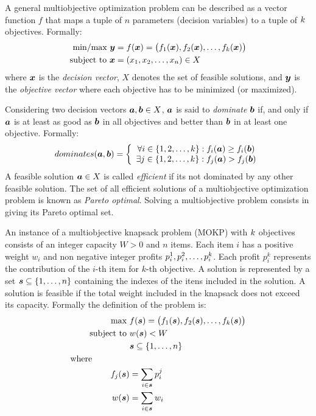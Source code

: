 A general multiobjective optimization problem can be described as a vector
function $f$ that maps a tuple of $n$ parameters (decision variables) to a tuple
of $k$ objectives.
Formally:
\begin{align*}
  \text{min/max} ~ \boldsymbol{y} &= f(\boldsymbol{x}) = 
    \big(f_1(\boldsymbol{x})
    ,f_2(\boldsymbol{x})
    ,\ldots
    ,f_{k}(\boldsymbol{x})\big) \\
  \text{subject to} ~ \boldsymbol{x} & = (x_1, x_2, \ldots, x_n) \in X
\end{align*}
where $\boldsymbol{x}$ is the \emph{decision vector}, $X$ denotes the set
of feasible solutions, and $\boldsymbol{y}$ is the \emph{objective vector} where
each objective has to be minimized (or maximized).

Considering two decision vectors $\boldsymbol{a}, \boldsymbol{b} \in X$, $\boldsymbol{a}$ is said to
\emph{dominate} $\boldsymbol{b}$ if, and only if $\boldsymbol{a}$ is at least as good as $\boldsymbol{b}$
in all objectives and better than $\boldsymbol{b}$ in at least one objective.
Formally:
\begin{displaymath}
    dominates(\boldsymbol{a}, \boldsymbol{b}) = \left\{
      \begin{array}{c}
    \forall i \in \{1, 2, \ldots, k\}: f_i(\boldsymbol{a}) \geq f_i(\boldsymbol{b}) \\
    \exists j \in \{1, 2, \ldots, k\}: f_j(\boldsymbol{a}) > f_j(\boldsymbol{b})
  \end{array} \right.
\end{displaymath}
A feasible solution $\boldsymbol{a} \in X$ is called \emph{efficient} %
if its not dominated by any other feasible solution.
The set of all efficient solutions of a multiobjective optimization problem is
known as \emph{Pareto optimal}.
Solving a multiobjective problem consists in giving its Pareto optimal set.

An instance of a multiobjective knapsack problem (MOKP) with $k$
objectives consists of an integer capacity $W > 0$ and $n$ items.
Each item $i$ has a positive weight $w_i$ and non negative integer
profits $p_i^1, p_i^2, \ldots, p_{i}^{k}$.
Each profit $p_i^k$ represents the contribution of the $i$-th item for $k$-th objective.
A solution is represented by a set $\boldsymbol{s} \subseteq \{1, \ldots, n\}$
containing the indexes of the itens included in the solution.
A solution is feasible if the total weight included in the knapsack does
not exceed its capacity.
Formally the definition of the problem is:
\begin{align*}
    \text{max   } & f(\boldsymbol{s}) = 
      \big(f_1(\boldsymbol{s}) ,f_2(\boldsymbol{s}) ,\ldots ,f_{k}(\boldsymbol{s})\big) \\
    \text{subject to   } & w(\boldsymbol{s}) < W \\
    & \boldsymbol{s} \subseteq \{1, \ldots, n\}\\
    \text{where} \phantom{mmmmm} \\
    f_j(\boldsymbol{s}) &= \sum_{i \in \boldsymbol{s}} p^j_i\\
    w(\boldsymbol{s}) &= \sum_{i \in \boldsymbol{s}} w_i
\end{align*}

